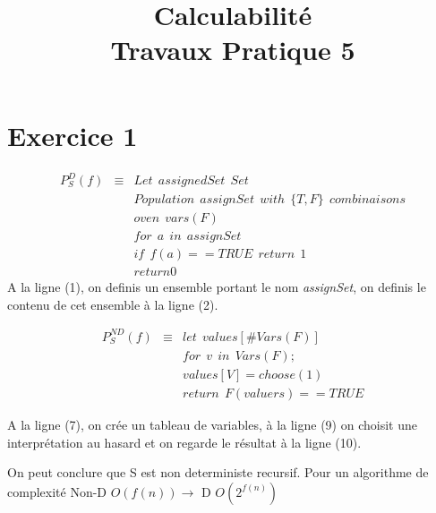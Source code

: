 \documentclass[a4paper,11pt,onecolumn]{article}
\title{Calculabilité\\Travaux Pratique 5}
\date{}
\begin{document}
\maketitle

\section*{Exercice 1}

\begin{eqnarray}
	P^D_S(f) 	&\equiv& Let \:\: assignedSet \:\: Set\\
				&& Population \:\: assignSet \:\: with \:\: \{T,F\} \:\: combinaisons \\
				&& oven \:\: vars(F) \\
				&& for \:\: a \:\: in \:\: assignSet \\
				&& if \:\: f(a) == TRUE \:\: return \:\: 1 \\
				&& return 0
\end{eqnarray}
A la ligne (1), on definis un ensemble portant le nom \textit{assignSet}, on definis le contenu de cet ensemble à la ligne (2).


\begin{eqnarray}
	P^{ND}_S(f) &\equiv& let \:\: values[\#Vars(F)]  \\
				&& for \:\: v \:\: in \:\: Vars(F); \\
				&& values[V] = choose(1) \\
				&& return \:\: F(valuers) == TRUE
\end{eqnarray}

A la ligne (7), on crée un tableau de variables, à la ligne (9) on choisit une interprétation au hasard et on regarde le résultat à la ligne (10).

On peut conclure que S est non deterministe recursif. Pour un algorithme de complexité Non-D $O(f(n)) \rightarrow$ D $O(2^{f(n)})$
\end{document}
